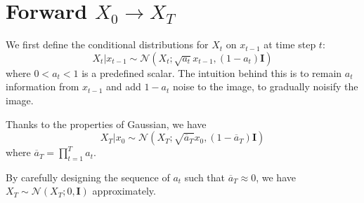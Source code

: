 \section{Forward $X_0 \rightarrow X_T$}
We first define the conditional distributions for $X_t$ on $x_{t-1}$ at time step $t$:
$$
X_t \vert x_{t-1} \sim \mathcal{N}(X_{t}; \sqrt{a_t}x_{t-1}, (1-a_t) \mathbf{I})
$$
where $0< a_t < 1$ is a predefined scalar. The intuition behind this is to remain $a_t$ information from $x_{t-1}$ and add $1-a_t$ noise to the image, to gradually noisify the image.

Thanks to the properties of Gaussian, we have
$$
X_T \vert x_0 \sim \mathcal{N}(X_T; \sqrt{\overline{a}_T}x_0, (1-\overline{a}_T) \mathbf{I})
$$
where $\overline{a}_T = \prod_{t=1}^{T} a_t$.

By carefully designing the sequence of $a_t$ such that $\overline{a}_T \approx 0$, we have $X_T \sim \mathcal{N}(X_T; 0, \mathbf{I})$ approximately.

